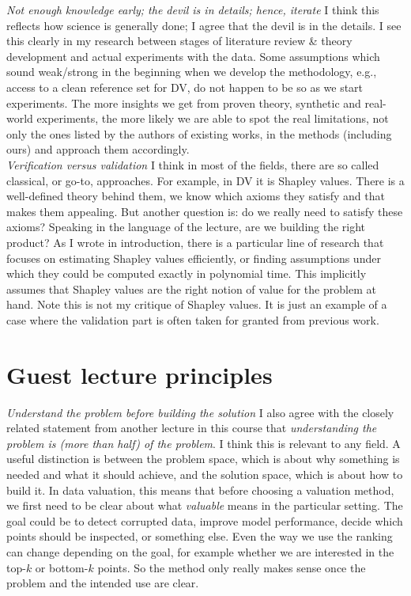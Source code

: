 \documentclass[11pt,a4paper]{article}
\begin{document}
\emph{Not enough knowledge early; the devil is in details; hence, iterate} 
I think this reflects how science is generally done; I agree that the devil is in the details. I see this clearly in my research between stages of literature review \& theory development and actual experiments with the data.  Some assumptions which sound weak/strong in the beginning when we develop the methodology, e.g., access to a clean reference set for DV, do not happen to be so as we start experiments. The more insights we get from proven theory, synthetic and real-world experiments, the more likely we are able to spot the real limitations, not only the ones listed by the authors of existing works, in the methods (including ours) and approach them accordingly. \\

\emph{Verification versus validation}
I think in most of the fields, there are so called classical, or go-to, approaches. For example, in DV it is Shapley values. There is a well-defined theory behind them, we know which axioms they satisfy and that makes them appealing. But another question is: do we really need to satisfy these axioms? Speaking in the language of the lecture, are we building the right product? As I wrote in introduction, there is a particular line of research that focuses on estimating Shapley values efficiently, or finding assumptions under which they could be computed exactly in polynomial time. This implicitly assumes that Shapley values are the right notion of value for the problem at hand. Note this is not my critique of Shapley values. It is just an example of a case where the validation part is often taken for granted from previous work. 


\section{Guest lecture principles}

\emph{Understand the problem before building the solution} I also agree with the closely related statement from another lecture in this course that \emph{understanding the problem is (more than half) of the problem}. I think this is relevant to any field. A useful distinction is between the problem space, which is about why something is needed and what it should achieve, and the solution space, which is about how to build it. In data valuation, this means that before choosing a valuation method, we first need to be clear about what \textit{valuable} means in the particular setting. The goal could be to detect corrupted data, improve model performance, decide which points should be inspected, or something else. Even the way we use the ranking can change depending on the goal, for example whether we are interested in the top-$k$ or bottom-$k$ points. So the method only really makes sense once the problem and the intended use are clear.\\
\end{document}

